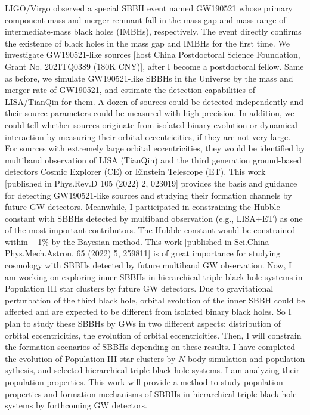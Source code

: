 \documentclass[12pt,a4paper,sans]{article}%
\begin{document}
LIGO/Virgo observed a special SBBH event named
GW190521 whose primary component mass and merger remnant fall in the mass gap and mass range of intermediate-mass black holes (IMBHs), respectively. The event directly confirms the existence of
black holes in the mass gap and IMBHs for the first time. We investigate GW190521-like sources [host China Postdoctoral Science Foundation, Grant No. 2021TQ0389 (180K CNY)], after I become a postdoctoral fellow. Same as before, we simulate GW190521-like SBBHs in the
Universe by the mass and merger rate of GW190521, and estimate the detection capabilities of LISA/TianQin for them. A
dozen of sources could be detected independently and their source
parameters could be measured with high precision. In addition, we could tell whether sources originate from isolated binary evolution
or dynamical interaction by measuring their orbital eccentricities, if they are not very large. For sources with extremely large orbital
eccentricities, they would be identified by multiband observation of LISA (TianQin) and the third generation
ground-based detectors Cosmic Explorer (CE) or Einstein
Telescope (ET). This work [published in Phys.Rev.D 105 (2022) 2, 023019] provides
the basis and guidance for detecting GW190521-like sources and studying their formation channels by future GW detectors. Meanwhile, I participated in constraining the Hubble
constant with SBBHs detected by multiband observation (e.g., LISA+ET) as one of the most important
contributors. The Hubble constant would be constrained within ~ 1\% by the Bayesian method. This work [published in Sci.China Phys.Mech.Astron. 65 (2022) 5, 259811] is of great
importance for studying cosmology with SBBHs detected by future multiband GW observation. Now, I am working on
exploring inner SBBHs in hierarchical triple black hole systems in Population III star clusters by future GW detectors.
Due to gravitational perturbation of the third black hole, orbital evolution of the inner SBBH could be affected and are
expected to be different from isolated binary black holes. So I plan to
study these SBBHs by GWs in two different aspects: distribution of orbital
eccentricities, the evolution of orbital eccentricities. Then, I will constrain the formation scenarios of SBBHs depending on these results. I have completed the evolution of
Population III star clusters by $N$-body simulation and population sythesis, and selected hierarchical triple black hole systems. I am analyzing
their population properties. This work will provide a method 
to study population properties and formation mechanisms of SBBHs in hierarchical triple black hole systems by forthcoming GW detectors.
\end{document}

